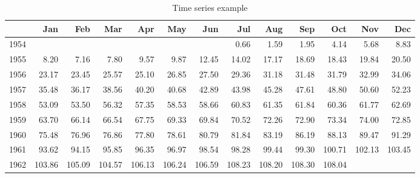\begin{table}[h]
\centering
\caption{Time series example} 
\begin{tabular}{rrrrrrrrrrrrr}
  \hline
 & Jan & Feb & Mar & Apr & May & Jun & Jul & Aug & Sep & Oct & Nov & Dec \\ 
  \hline
1954 &  &  &  &  &  &  & 0.66 & 1.59 & 1.95 & 4.14 & 5.68 & 8.83 \\ 
  1955 & 8.20 & 7.16 & 7.80 & 9.57 & 9.87 & 12.45 & 14.02 & 17.17 & 18.69 & 18.43 & 19.84 & 20.50 \\ 
  1956 & 23.17 & 23.45 & 25.57 & 25.10 & 26.85 & 27.50 & 29.36 & 31.18 & 31.48 & 31.79 & 32.99 & 34.06 \\ 
  1957 & 35.48 & 36.17 & 38.56 & 40.20 & 40.68 & 42.89 & 43.98 & 45.28 & 47.61 & 48.80 & 50.60 & 52.23 \\ 
  1958 & 53.09 & 53.50 & 56.32 & 57.35 & 58.53 & 58.66 & 60.83 & 61.35 & 61.84 & 60.36 & 61.77 & 62.69 \\ 
  1959 & 63.70 & 66.14 & 66.54 & 67.75 & 69.33 & 69.84 & 70.52 & 72.26 & 72.90 & 73.34 & 74.00 & 72.85 \\ 
  1960 & 75.48 & 76.96 & 76.86 & 77.80 & 78.61 & 80.79 & 81.84 & 83.19 & 86.19 & 88.13 & 89.47 & 91.29 \\ 
  1961 & 93.62 & 94.15 & 95.85 & 96.35 & 96.97 & 98.54 & 98.28 & 99.44 & 99.30 & 100.71 & 102.13 & 103.45 \\ 
  1962 & 103.86 & 105.09 & 104.57 & 106.13 & 106.24 & 106.59 & 108.23 & 108.20 & 108.30 & 108.04 &  &  \\ 
   \hline
\end{tabular}
\end{table}
